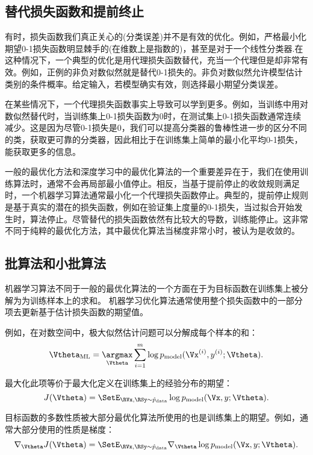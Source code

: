 \subsection{替代损失函数和提前终止}

有时，损失函数我们真正关心的(分类误差)并不是有效的优化。例如，严格最小化期望0-1损失函数明显棘手的(在维数上是指数的)，甚至是对于一个线性分类器\citep{Marcotte-92}.在这种情况下，一个典型的优化是用代理损失函数替代，充当一个代理但是却非常有效。例如，正例的非负对数似然就是替代0-1损失的。非负对数似然允许模型估计类别的条件概率。给定输入，若模型确实有效，则选择最小期望分类误差。

在某些情况下，一个代理损失函数事实上导致可以学到更多。例如，当训练中用对数似然替代时，当训练集上0-1损失函数为0时，在测试集上0-1损失函数通常连续减少。这是因为尽管0-1损失是0，我们可以提高分类器的鲁棒性进一步的区分不同的类，获取更可靠的分类器，因此相比于在训练集上简单的最小化平均0-1损失，能获取更多的信息。

一般的最优化方法和深度学习中的最优化算法的一个重要差异在于，我们在使用训练算法时，通常不会再局部最小值停止。相反，当基于提前停止的收敛规则满足时，一个机器学习算法通常最小化一个代理损失函数停止。典型的，提前停止规则是基于真实的潜在的损失函数，例如在验证集上度量的0-1损失，当过拟合开始发生时，算法停止。尽管替代的损失函数依然有比较大的导数，训练能停止。这非常不同于纯粹的最优化方法，其中最优化算法当梯度非常小时，被认为是收敛的。

\subsection{批算法和小批算法}
机器学习算法不同于一般的最优化算法的一个方面在于为目标函数在训练集上被分解为为训练样本上的求和。
机器学习优化算法通常使用整个损失函数中的一部分项去更新基于估计损失函数的期望值。

例如，在对数空间中，极大似然估计问题可以分解成每个样本的和：
\begin{equation}
\label{eq:8.4}
    \Vtheta_{\text{ML}} = \underset{\Vtheta}{\argmax} \sum_{i=1}^m
    \log p_{\text{model}} (\Vx^{(i)}, y^{(i)}; \Vtheta) .
\end{equation}

最大化此项等价于最大化定义在训练集上的经验分布的期望：
\begin{equation}
\label{eq:8.5}
    J(\Vtheta) = \SetE_{\RVx, \RSy \sim\hat{p}_\text{data}}
    \log p_{\text{model}} (\Vx,y ; \Vtheta) .
\end{equation}

目标函数的多数性质被大部分最优化算法所使用的也是训练集上的期望。例如，通常大部分使用的性质是梯度：
\begin{equation}
\label{eq:8.6}
    \nabla_{\Vtheta} J(\Vtheta) = \SetE_{\RVx, \RSy \sim\hat{p}_{\text{data}}}
    \nabla_{\Vtheta} \log p_{\text{model}} (\Vx,y; \Vtheta) .
\end{equation}

